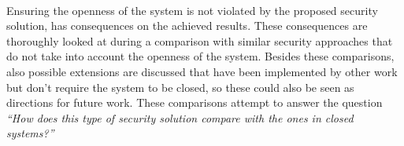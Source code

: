 \paragraph*{}
Ensuring the openness of the system is not violated by the proposed security solution, has consequences on the achieved results. These consequences are thoroughly looked at during a comparison with similar security approaches that do not take into account the openness of the system. Besides these comparisons, also possible extensions are discussed that have been implemented by other work but don't require the system to be closed, so these could also be seen as directions for future work. These comparisons attempt to answer the question \textit{\enquote{How does this type of security solution compare with the ones in closed systems?}}